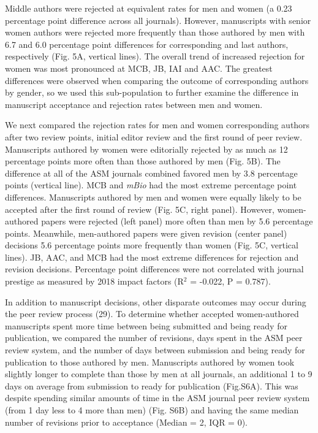 \documentclass[11pt,]{article}
\begin{document}
Middle authors were rejected at equivalent rates for men and women (a
0.23 percentage point difference across all journals). However,
manuscripts with senior women authors were rejected more frequently than
those authored by men with 6.7 and 6.0 percentage point differences for
corresponding and last authors, respectively (Fig. 5A, vertical lines).
The overall trend of increased rejection for women was most pronounced
at MCB, JB, IAI and AAC. The greatest differences were observed when
comparing the outcome of corresponding authors by gender, so we used
this sub-population to further examine the difference in manuscript
acceptance and rejection rates between men and women.

We next compared the rejection rates for men and women corresponding
authors after two review points, initial editor review and the first
round of peer review. Manuscripts authored by women were editorially
rejected by as much as 12 percentage points more often than those
authored by men (Fig. 5B). The difference at all of the ASM journals
combined favored men by 3.8 percentage points (vertical line). MCB and
\emph{mBio} had the most extreme percentage point differences.
Manuscripts authored by men and women were equally likely to be accepted
after the first round of review (Fig. 5C, right panel). However,
women-authored papers were rejected (left panel) more often than men by
5.6 percentage points. Meanwhile, men-authored papers were given
revision (center panel) decisions 5.6 percentage points more frequently
than women (Fig. 5C, vertical lines). JB, AAC, and MCB had the most
extreme differences for rejection and revision decisions. Percentage
point differences were not correlated with journal prestige as measured
by 2018 impact factors (R\({^2}\) = -0.022, P = 0.787).

In addition to manuscript decisions, other disparate outcomes may occur
during the peer review process (29). To determine whether accepted
women-authored manuscripts spent more time between being submitted and
being ready for publication, we compared the number of revisions, days
spent in the ASM peer review system, and the number of days between
submission and being ready for publication to those authored by men.
Manuscripts authored by women took slightly longer to complete than
those by men at all journals, an additional 1 to 9 days on average from
submission to ready for publication (Fig.S6A). This was despite spending
similar amounts of time in the ASM journal peer review system (from 1
day less to 4 more than men) (Fig. S6B) and having the same median
number of revisions prior to acceptance (Median = 2, IQR = 0).
\end{document}
